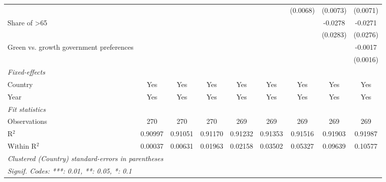 \begin{table}[htbp]
\begin{tabular}{lcccccccc}
                                              &          &          &          &          &              & (0.0068)     & (0.0073)     & (0.0071)\\   
      Share of >65                            &          &          &          &          &              &              & -0.0278      & -0.0271\\   
                                              &          &          &          &          &              &              & (0.0283)     & (0.0276)\\   
      Green vs. growth government preferences &          &          &          &          &              &              &              & -0.0017\\   
                                              &          &          &          &          &              &              &              & (0.0016)\\   
      \midrule
      \emph{Fixed-effects}\\
      Country                                 & Yes      & Yes      & Yes      & Yes      & Yes          & Yes          & Yes          & Yes\\  
      Year                                    & Yes      & Yes      & Yes      & Yes      & Yes          & Yes          & Yes          & Yes\\  
      \midrule
      \emph{Fit statistics}\\
      Observations                            & 270      & 270      & 270      & 269      & 269          & 269          & 269          & 269\\  
      R$^2$                                   & 0.90997  & 0.91051  & 0.91170  & 0.91232  & 0.91353      & 0.91516      & 0.91903      & 0.91987\\  
      Within R$^2$                            & 0.00037  & 0.00631  & 0.01963  & 0.02158  & 0.03502      & 0.05327      & 0.09639      & 0.10577\\  
      \midrule \midrule
      \multicolumn{9}{l}{\emph{Clustered (Country) standard-errors in parentheses}}\\
      \multicolumn{9}{l}{\emph{Signif. Codes: ***: 0.01, **: 0.05, *: 0.1}}\\
   \end{tabular}
\end{table}


